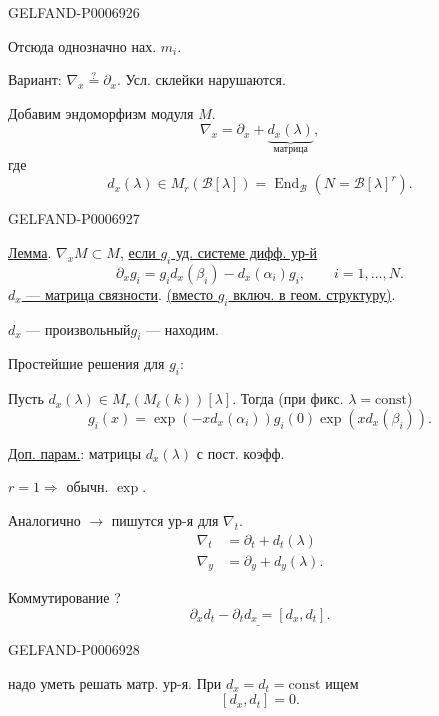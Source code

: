 \begin{GelfandAdjacentEvidence}{GELFAND-P000692}{6}

Отсюда однозначно нах. \(m_i\).

Вариант: \(\nabla_x\overset{?}{=}\partial_x\).
Усл. склейки нарушаются.

Добавим эндоморфизм модуля \(M\).
\[
\nabla_x=\partial_x+\underbrace{d_x(\lambda)}_{\text{матрица}},
\]
где
\[
d_x(\lambda)\in M_r(\mathcal B[\lambda])
=\operatorname{End}_{\mathcal B}(N=\mathcal B[\lambda]^r).
\]
\end{GelfandAdjacentEvidence}
\begin{GelfandAdjacentEvidence}{GELFAND-P000692}{7}


\underline{Лемма}. \(\nabla_x M\subset M\), \underline{если \(g_i\) уд. системе дифф. ур-й}
\[
\partial_xg_i=g_i d_x(\beta_i)-d_x(\alpha_i)g_i,\qquad i=1,\ldots,N.
\]
\underline{\(d_x\) --- матрица связности}. \underline{(вместо \(g_i\) включ. в геом. структуру)}.

\(d_x\) --- произвольный\qquad \(g_i\) --- находим.

Простейшие решения для \(g_i\):

Пусть \(d_x(\lambda)\in M_r(M_\ell(k))[\lambda]\). Тогда
(при фикс. \(\lambda=\mathrm{const}\))
\[
g_i(x)=\exp(-x d_x(\alpha_i))g_i(0)\exp(x d_x(\beta_i)).
\]

\underline{Доп. парам.}: матрицы \(d_x(\lambda)\) с пост. коэфф.

\(r=1\Rightarrow\) обычн. \(\exp\).

Аналогично \(\rightarrow\) пишутся ур-я для \(\nabla_t\).
\[
\begin{aligned}
\nabla_t&=\partial_t+d_t(\lambda)\\
\nabla_y&=\partial_y+d_y(\lambda).
\end{aligned}
\]

Коммутирование ?
\[
\underline{\partial_xd_t-\partial_td_x=[d_x,d_t]}.
\]
\end{GelfandAdjacentEvidence}
\begin{GelfandAdjacentEvidence}{GELFAND-P000692}{8}


надо уметь решать матр. ур-я. При \(d_x=d_t=\mathrm{const}\) ищем
\[
[d_x,d_t]=0.
\]
\end{GelfandAdjacentEvidence}
